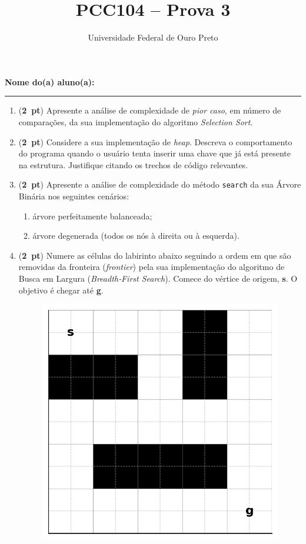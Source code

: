\documentclass[12pt]{article}
\title{PCC104 – Prova 3}
\author{Universidade Federal de Ouro Preto}
\date{}
\begin{document}
\maketitle

\noindent\textbf{Nome do(a) aluno(a):} \rule{11cm}{0.4pt}

\bigskip

\begin{enumerate}

  \item (\textbf{2~pt}) Apresente a análise de complexidade de \emph{pior caso}, em número de comparações, da sua implementação do algoritmo \textit{Selection Sort}. 
  \medskip
  
  \item (\textbf{2~pt}) Considere a sua implementação de \textit{heap}. Descreva o comportamento do programa quando o usuário tenta inserir uma chave que já está presente na estrutura. Justifique citando os trechos de código relevantes.
  \medskip

  \item (\textbf{2~pt}) Apresente a análise de complexidade do método \texttt{search} da sua Árvore Binária nos seguintes cenários:
  \begin{enumerate}
    \item árvore perfeitamente balanceada;
    \item árvore degenerada (todos os nós à direita ou à esquerda).
  \end{enumerate}
  \medskip

  \item (\textbf{2~pt}) Numere as células do labirinto abaixo seguindo a ordem em que são removidas da fronteira (\emph{frontier}) pela sua implementação do algoritmo de Busca em Largura (\emph{Breadth‑First Search}). Comece do vértice de origem, \textbf{s}. O objetivo é chegar até \textbf{g}. 
  \begin{figure}[h]
    \centering
    \includegraphics[width=.45\textwidth]{maze.png}
  \end{figure}
  \medskip


\end{enumerate}
\end{document}
